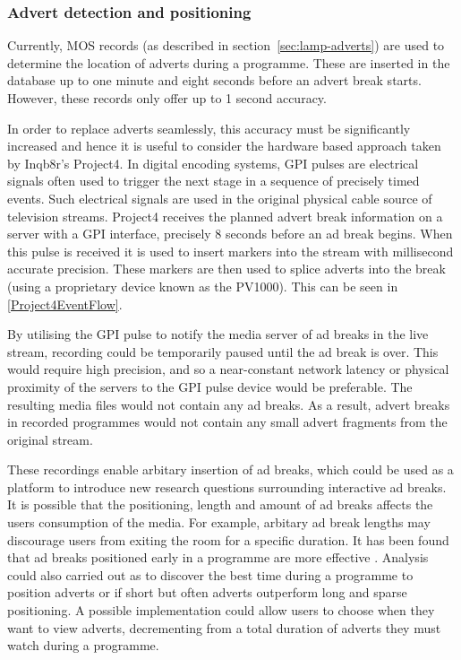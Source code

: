 	\subsubsection{Advert detection and positioning}

	Currently, MOS records (as described in section~\ref{sec:lamp-adverts}) are used to determine the location of adverts during a programme. These are inserted in the database up to one minute and eight seconds before an advert break starts. However, these records only offer up to 1 second accuracy.

	In order to replace adverts seamlessly, this accuracy must be significantly increased and hence it is useful to consider the hardware based approach taken by Inqb8r's Project4. In digital encoding systems, GPI pulses are electrical signals often used to trigger the next stage in a sequence of precisely timed events. Such electrical signals are used in the original physical cable source of television streams. Project4 receives the planned advert break information on a server with a GPI interface, precisely 8 seconds before an ad break begins. When this pulse is received it is used to insert markers into the stream with millisecond accurate precision. These markers are then used to splice adverts into the break (using a proprietary device known as the PV1000). This can be seen in \ref{Project4EventFlow}.


	By utilising the GPI pulse to notify the media server of ad breaks in the live stream, recording could be temporarily paused until the ad break is over. This would require high precision, and so a near-constant network latency or physical proximity of the servers to the GPI pulse device would be preferable. The resulting media files would not contain any ad breaks. As a result, advert breaks in recorded programmes would not contain any small advert fragments from the original stream.

	These recordings enable arbitary insertion of ad breaks, which could be used as a platform to introduce new research questions surrounding interactive ad breaks. It is possible that the positioning, length and amount of ad breaks affects the users consumption of the media. For example, arbitary ad break lengths may discourage users from exiting the room for a specific duration. It has been found that ad breaks positioned early in a programme are more effective \citep{jeong2011position}. Analysis could also carried out as to discover the best time during a programme to position adverts or if short but often adverts outperform long and sparse positioning. A possible implementation could allow users to choose when they want to view adverts, decrementing from a total duration of adverts they must watch during a programme.

